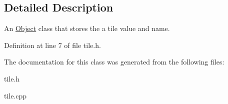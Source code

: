 \subsection{Detailed Description}
An \hyperlink{classObject}{Object} class that stores the a tile value and name. 

Definition at line 7 of file tile.\+h.



The documentation for this class was generated from the following files\+:\begin{DoxyCompactItemize}
\item 
tile.\+h\item 
tile.\+cpp\end{DoxyCompactItemize}
